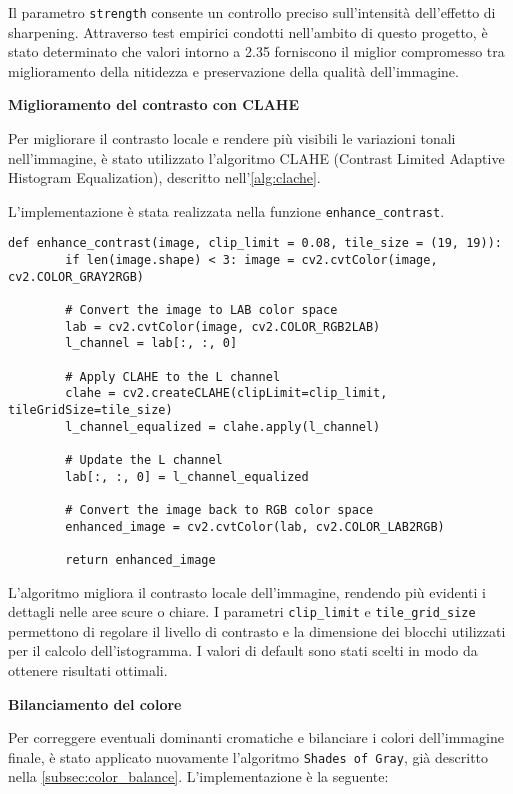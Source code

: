 Il parametro \texttt{strength} consente un controllo preciso sull'intensità dell'effetto di sharpening. Attraverso test empirici condotti nell'ambito di questo progetto, è stato determinato che valori intorno a 2.35 forniscono il miglior compromesso tra miglioramento della nitidezza e preservazione della qualità dell'immagine.

\textbf{Miglioramento del contrasto con CLAHE}

Per migliorare il contrasto locale e rendere più visibili le variazioni tonali nell'immagine, è stato utilizzato l'algoritmo CLAHE (Contrast Limited Adaptive Histogram Equalization), descritto nell'\cref{alg:clache}.

L'implementazione è stata realizzata nella funzione \texttt{enhance\_contrast}.

\begin{lstlisting}[label={lst:clache}]
    def enhance_contrast(image, clip_limit = 0.08, tile_size = (19, 19)):
        if len(image.shape) < 3: image = cv2.cvtColor(image, cv2.COLOR_GRAY2RGB)

        # Convert the image to LAB color space
        lab = cv2.cvtColor(image, cv2.COLOR_RGB2LAB)
        l_channel = lab[:, :, 0]

        # Apply CLAHE to the L channel
        clahe = cv2.createCLAHE(clipLimit=clip_limit, tileGridSize=tile_size)
        l_channel_equalized = clahe.apply(l_channel)

        # Update the L channel
        lab[:, :, 0] = l_channel_equalized

        # Convert the image back to RGB color space
        enhanced_image = cv2.cvtColor(lab, cv2.COLOR_LAB2RGB)

        return enhanced_image
\end{lstlisting}

L'algoritmo migliora il contrasto locale dell'immagine, rendendo più evidenti i dettagli nelle aree scure o chiare. I parametri \texttt{clip\_limit} e \texttt{tile\_grid\_size} permettono di regolare il livello di contrasto e la dimensione dei blocchi utilizzati per il calcolo dell'istogramma. I valori di default sono stati scelti in modo da ottenere risultati ottimali.

\textbf{Bilanciamento del colore}

Per correggere eventuali dominanti cromatiche e bilanciare i colori dell'immagine finale, è stato applicato nuovamente l'algoritmo \texttt{Shades of Gray}, già descritto nella \cref{subsec:color_balance}. L'implementazione è la seguente:

